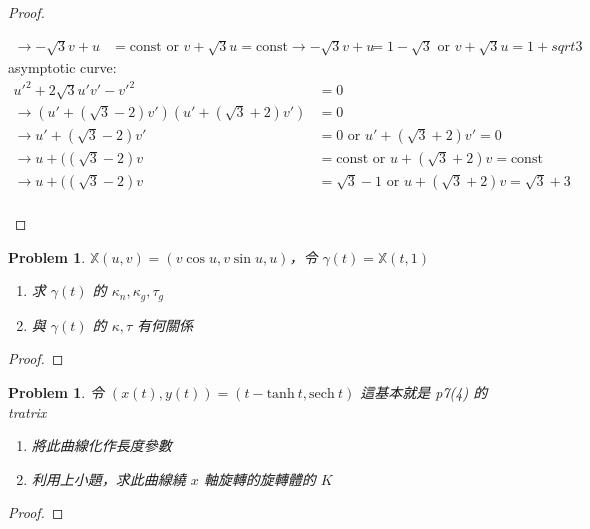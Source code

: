 \documentclass[10pt,a4paper]{article}
\newcounter{theProblemCounter}
\newtheorem{problem}[theProblemCounter]{Problem}
\begin{document}
\begin{proof}
\begin{enumerate}[{ (}a{)}]
\begin{align*}
\rightarrow -\sqrt{3}v+u&=\textrm{const or }v+\sqrt{3}u=\textrm{const}
\rightarrow -\sqrt{3}v+u&=1-\sqrt{3}\textrm{ or }v+\sqrt{3}u=1+sqrt{3}
\end{align*}
asymptotic curve:
\begin{align*}
u'^2+2\sqrt{3}u'v'-v'^2&=0\\
\rightarrow (u'+(\sqrt{3}-2)v')(u'+(\sqrt{3}+2)v')&=0\\
\rightarrow u'+(\sqrt{3}-2)v'&=0\textrm{ or }u'+(\sqrt{3}+2)v'=0\\
\rightarrow u+((\sqrt{3}-2)v&=\textrm{const or }u+(\sqrt{3}+2)v=\textrm{const}\\
\rightarrow u+((\sqrt{3}-2)v&=\sqrt{3}-1\textrm{ or }u+(\sqrt{3}+2)v=\sqrt{3}+3\\
\end{align*}
\end{enumerate}
\end{proof}

\setcounter{theProblemCounter}{4}
\begin{problem}
$\mathbb{X}(u, v) = (v\cos u, v\sin u, u)$，令 $\gamma(t)=\mathbb{X}(t, 1)$
\begin{enumerate}[{ (}a{)}]
\item 求 $\gamma(t)$ 的 $\kappa_n, \kappa_g, \tau_g$
\item 與 $\gamma(t)$ 的 $\kappa, \tau$ 有何關係
\end{enumerate}
\end{problem}
\begin{proof}
\end{proof}

\setcounter{theProblemCounter}{5}
\begin{problem}
令 $(x(t), y(t)) = (t-\mathrm{tanh\ } t, \mathrm{sech\ } t)$ 這基本就是 p7(4) 的 tratrix
\begin{enumerate}[{ (}a{)}]
\item 將此曲線化作長度參數
\item 利用上小題，求此曲線繞 $x$ 軸旋轉的旋轉體的 $K$
\end{enumerate}
\end{problem}

\begin{proof}
\end{proof}
\end{document}
